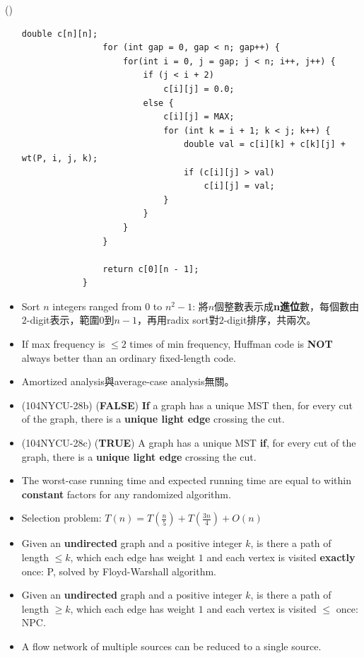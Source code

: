 \begin{theorem}{()}
\begin{itemize}
\begin{lstlisting}[caption={Minimum triangulation.}, captionpos=b]
                double c[n][n];
                for (int gap = 0, gap < n; gap++) {
                    for(int i = 0, j = gap; j < n; i++, j++) {
                        if (j < i + 2)
                            c[i][j] = 0.0;
                        else {
                            c[i][j] = MAX;
                            for (int k = i + 1; k < j; k++) {
                                double val = c[i][k] + c[k][j] + wt(P, i, j, k);
                                if (c[i][j] > val)
                                    c[i][j] = val;
                            }
                        }
                    }
                }

                return c[0][n - 1];
            }
        \end{lstlisting}
        \item Sort $n$ integers ranged from $0$ to $n^2 - 1$: 將$n$個整數表示成\textbf{n進位}數，每個數由$2$-digit表示，範圍$0$到$n - 1$，再用radix sort對$2$-digit排序，共兩次。
        \item If max frequency is $\le 2$ times of min frequency, Huffman code is \textbf{NOT} always better than an ordinary fixed-length code.
        \item Amortized analysis與average-case analysis無關。
        \item (104NYCU-28b) (\textbf{FALSE}) \textbf{If} a graph has a unique MST then, for every cut of the graph, there is a \textbf{unique light edge} crossing the cut.
        \item (104NYCU-28c) (\textbf{TRUE}) A graph has a unique MST \textbf{if}, for every cut of the graph, there is a \textbf{unique light edge} crossing the cut.
        \item The worst-case running time and expected running time are equal to within \textbf{constant} factors for any randomized algorithm.
        \item Selection problem: $T(n) = T(\frac{n}{5}) + T(\frac{3n}{4}) + O(n)$
        \item Given an \textbf{undirected} graph and a positive integer $k$, is there a path of length $\le k$, which each edge has weight $1$ and each vertex is visited \textbf{exactly} once: P, solved by Floyd-Warshall algorithm.
        \item Given an \textbf{undirected} graph and a positive integer $k$, is there a path of length $\ge k$, which each edge has weight $1$ and each vertex is visited $\le$ once: NPC.
        \item A flow network of multiple sources can be reduced to a single source.

\end{itemize}
\end{theorem}
